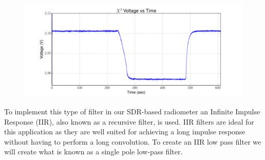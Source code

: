 {\begin{figure}[h!tb] 
\centering
\includegraphics[width=17cm]{Experiments/Exp1/x2_filter.pdf}
\label{square_raw_filt}
\end{figure}
}

To implement this type of filter in our SDR-based radiometer an Infinite Impulse Response (IIR), also known as a recursive filter, is used.  IIR filters are ideal for this application as they are well suited for achieving a long impulse response without having to perform a long convolution.  To create an IIR low pass filter we will create what is known as a single pole low-pass filter.  



